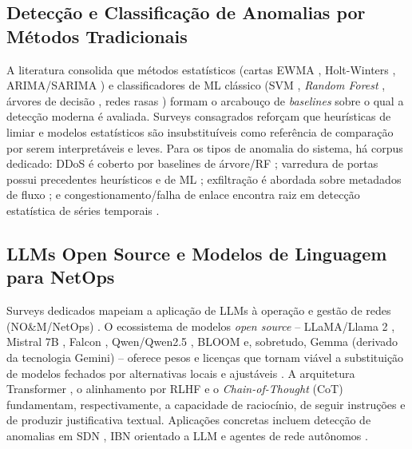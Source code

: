 \documentclass[12pt,a4paper]{article}
\begin{document}
\subsection{Detecção e Classificação de Anomalias por Métodos Tradicionais}
\label{sec:ml}

A literatura consolida que métodos estatísticos (cartas EWMA \cite{rA22}, Holt-Winters
\cite{rA21}, ARIMA/SARIMA \cite{rA25}\cite{rA27}) e classificadores de ML clássico (SVM
\cite{rA213}, \textit{Random Forest} \cite{rA210}, árvores de decisão \cite{rA217}, redes
rasas \cite{rA231}) formam o arcabouço de \textit{baselines} sobre o qual a detecção
moderna é avaliada. Surveys consagrados \cite{rA28}\cite{rA29}\cite{rA210}\cite{rA212} reforçam que
heurísticas de limiar e modelos estatísticos são insubstituíveis como
referência de comparação por serem interpretáveis e leves. Para os tipos de
anomalia do sistema, há corpus dedicado: DDoS é coberto por baselines de
árvore/RF \cite{rA222}\cite{rA224}\cite{rA225}; varredura de portas possui precedentes
heurísticos e de ML \cite{rA227}\cite{rA229}; exfiltração é abordada sobre metadados
de fluxo \cite{rA226}; e congestionamento/falha de enlace encontra raiz em detecção
estatística de séries temporais \cite{rA21}\cite{rA232}\cite{rA21}.

\subsection{LLMs Open Source e Modelos de Linguagem para NetOps}
\label{sec:llm}

Surveys dedicados mapeiam a aplicação de LLMs à operação e gestão de redes
(NO\&M/NetOps) \cite{rA31}\cite{rA32}\cite{rA33}\cite{rA34}\cite{rA35}\cite{rA36}\cite{rA37}. O ecossistema de modelos
\textit{open source} -- LLaMA/Llama 2 \cite{rA310}\cite{rA311}, Mistral 7B \cite{rA312}, Falcon
\cite{rA313}, Qwen/Qwen2.5 \cite{rA314}\cite{rA315}, BLOOM \cite{rA316} e, sobretudo, Gemma
\cite{rA317} (derivado da tecnologia Gemini) -- oferece pesos e licenças que tornam
viável a substituição de modelos fechados por alternativas locais e ajustáveis
\cite{rA41}. A arquitetura Transformer \cite{rA319}, o alinhamento por RLHF \cite{rA320} e o
\textit{Chain-of-Thought} (CoT) \cite{rA321} fundamentam, respectivamente, a
capacidade de raciocínio, de seguir instruções e de produzir justificativa
textual. Aplicações concretas incluem detecção de anomalias em SDN
\cite{rA325}\cite{rA327}, IBN orientado a LLM \cite{rA324}\cite{rA332}\cite{rA333} e agentes de rede
autônomos \cite{rA338}\cite{rA334}\cite{rA335}\cite{rA336}\cite{rA337}.
\end{document}
